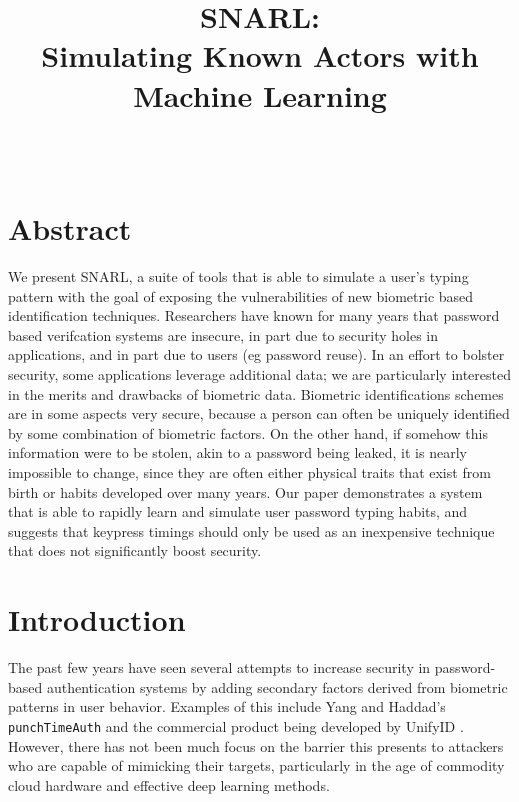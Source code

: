 \documentclass[9pt,journal]{IEEEtran}
\title{SNARL:\\Simulating Known Actors with Machine Learning}
\author{\IEEEauthorblockN{Bryan Cai, Yasyf Mohamedali}\\\IEEEauthorblockA{\{bcai, yasyf\}@mit.edu}}
\begin{document}
\maketitle

\section{Abstract}

We present SNARL, a suite of tools that is able to simulate a user's typing pattern with the goal of exposing the  vulnerabilities of new biometric based identification techniques. Researchers have known for many years that password based verifcation systems are insecure, in part due to security holes in applications, and in part due to users (eg password reuse). In an effort to bolster security, some applications leverage additional data; we are particularly interested in the merits and drawbacks of biometric data. Biometric identifications schemes are in some aspects very secure, because a person can often be uniquely identified by some combination of biometric factors. On the other hand, if somehow this information were to be stolen, akin to a password being leaked, it is nearly impossible to change, since they are often either physical traits that exist from birth or habits developed over many years. Our paper demonstrates a system that is able to rapidly learn and simulate user password typing habits, and suggests that keypress timings should only be used as an inexpensive technique that does not significantly boost security.

\section{Introduction}

The past few years have seen several attempts to increase security in password-based authentication systems by adding secondary factors derived from biometric patterns in user behavior. Examples of this include Yang and Haddad's \texttt{punchTimeAuth} \cite{punchtimeauth} and the commercial product being developed by UnifyID \cite{unifyid}. However, there has not been much focus on the barrier this presents to attackers who are capable of mimicking their targets, particularly in the age of commodity cloud hardware and effective deep learning methods.
\end{document}
